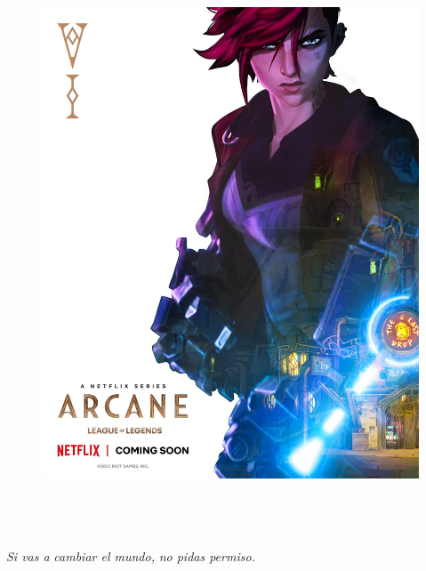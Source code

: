 \documentclass[11pt,a5paper]{article}
\begin{document}
\begin{figure}
    \includegraphics[scale=0.09, angle=-8]{Pelicula. Imagenes usadas/Vi, personaje menos favorito, pero que aún así es chido.jpg}
    \caption{\textcolor{white}{\small{Perdió a todos los que amaba, pero incluso en esa situación mantiene su corazón y actitud firme, además que encuentra una nueva persona que proteger con su picante y pasional actitud}}}
    \label{fig:my_label}
\end{figure}

\hspace{-2.8cm}\textit{Si vas a}\newline
\vspace{-0.1cm}
\hspace{-2.9cm}\textit{cambiar el mundo,}\newline
\vspace{-0.1cm}
\hspace{-2.9cm}\textit{no pidas permiso.}\newline
\end{document}
